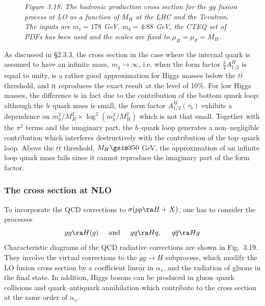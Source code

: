 \begin{figure}[h!]
\begin{center}
\vspace*{-.5cm}
\hspace*{-2cm}
\end{center}
\vspace*{-16.3cm}
{\it Figure 3.18: The hadronic production cross section for the $gg$ fusion
process at LO as a function of $M_H$ at the LHC and the Tevatron. The inputs
are  $m_t=178$ GeV, $m_b=4.88$ GeV, the CTEQ set of PDFs has been used
and the scales are fixed to $\mu_R=\mu_F=M_H$.} 
\vspace*{-.2cm}
\end{figure}

As discussed in \S2.3.3, the cross section in the case where the internal quark
is assumed to have an infinite mass, $m_q \to \infty$, i.e. when the form
factor $\frac{3}{4}A_{1/2}^H$ is equal to unity, is a rather good approximation
for Higgs masses below the $t\bar{t}$ threshold, and it reproduces the
exact result at the level of 10\%. For low Higgs masses, the difference
is in fact due to the contribution of the bottom quark loop: although the
$b$--quark mass is small, the form factor $A_{1/2}^H(\tau_b)$   exhibits a
dependence on $m_b^2/M_H^2 \times \log^2(m_b^2/M_H^2)$ which is not that small.
Together with the $\pi^2$ terms and the imaginary part, the
$b$--quark loop  generates a non--negligible contribution which interferes
destructively with the contribution of the top--quark loop. Above the
$t\bar{t}$ threshold, $M_H \gsim 350$ GeV, the approximation of an  infinite
loop quark mass fails since it cannot reproduce the imaginary part of the form
factor.

\subsubsection{The cross section at NLO}

To incorporate the QCD corrections to $\sigma (pp \ra H + X)$, one has to
consider the processes
\begin{equation}
gg \ra H (g)  \hspace{5mm} \mbox{and} \hspace{5mm}
gq \ra H q,   \hspace{5mm} q \overline{q} \ra H g
\end{equation}
Characteristic diagrams of the QCD radiative corrections are shown in 
Fig.~3.19. They involve the virtual corrections to the $gg \to H$ subprocess,
which modify the LO fusion cross section by a coefficient linear in $\alpha_s$,
and the radiation of gluons in the final state. In addition, Higgs bosons can
be produced in gluon--quark collisions and quark--antiquark annihilation which
contribute to the cross section  at the same order of $\alpha_s$. 


